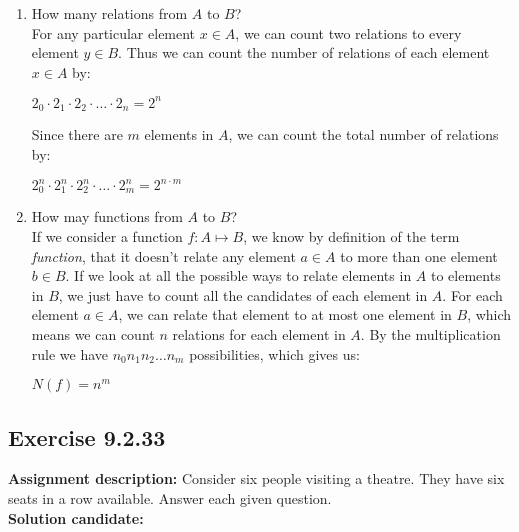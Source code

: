 \documentclass{report}
\newcommand{\cent}[1]{\begin{center}#1\end{center}}
\newcommand{\In}{\! \in \!}
\newcommand{\AssignmentDescription}{\textbf{Assignment description: }}
\newcommand{\Solution}{\textbf{Solution candidate: }}
\newcommand{\Exercise}[1]{\subsection{Exercise #1}}
\newcommand{\defaultEnumerateLabel}{\textbf{\alph*.}}
\newcommand{\MyItem}[1]{\item #1\\}
\begin{document}
 	\begin{enumerate}[label=\defaultEnumerateLabel]
 		\MyItem{How many relations from $A$ to $B$?}
 		
 		For any particular element $x \In A$, we can count two relations to every element $y \In B$. Thus we can count the number of relations of each element $x\In A$ by:
 		
 		\cent{$2_0 \cdot 2_1 \cdot 2_2 \cdot \dots \cdot 2_n = 2^n$}
 		
 		
 		Since there are $m$ elements in $A$, we can count the total number of relations by:
 		
 		\cent{$2_0^n \cdot 2_1^n \cdot 2_2^n \cdot \dots \cdot 2_m^n = 2^{n \cdot m}$}
 		
 		\MyItem{How may functions from $A$ to $B$?}
 		
 		If we consider a function $f : A \mapsto B$, we know by definition of the term \textit{function}, that it doesn't relate any element $a \In A$ to more than one element $b \In B$. If we look at all the possible ways to relate  elements in $A$ to elements in $B$, we just have to count all the candidates of each element in $A$. For each element $a \In A$, we can relate that element to at most one element in $B$, which means we can count $n$ relations for each element in $A$. By the multiplication rule we have $n_0 n_1 n_2 \dots n_m$ possibilities, which gives us:
 		
 		\cent{$N(f) = n^m$}
 		
 	\end{enumerate} 
 	
 	
 	\Exercise{9.2.33}
 	
 	\AssignmentDescription
 	Consider six people visiting a theatre.  They have six seats in a row available. Answer each given question.\\
 	
 	\Solution
 	
\end{document}
